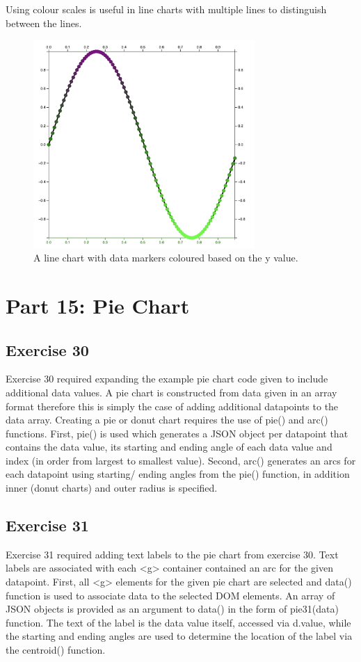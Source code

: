 \documentclass[11pt]{article}   	%
\begin{document}
Using colour scales is useful in line charts with multiple lines to distinguish between the lines.

\begin{figure}[H]
\centering
\includegraphics[width=0.75\textwidth]{data/ex29.png}
\caption{ A line chart with data markers coloured based on the y value.}
\label{fig:ex29}
\end{figure}


\section{Part 15: Pie Chart }
\subsection{Exercise 30}
\vspace{-1em}
Exercise 30 required expanding the example pie chart code given to include additional data values. A pie chart is constructed from data given in an array format therefore this is simply the case of adding additional datapoints to the data array. Creating a pie or donut chart requires the use of pie() and arc() functions. First, pie() is used which generates a JSON object per datapoint that contains the data value, its starting and ending angle of each data value and index (in order from largest to smallest value). Second, arc() generates an arcs for each datapoint using starting/ ending angles from the pie() function, in addition inner (donut charts) and outer radius is specified.

\subsection{ Exercise 31}
\vspace{-1em}
Exercise 31 required adding text labels to the pie chart from exercise 30. Text labels are associated with each <g> container contained an arc for the given datapoint. First, all <g> elements for the given pie chart are selected and data() function is used to associate data to the selected DOM elements. An array of JSON objects is provided as an argument to data() in the form of pie31(data) function. The text of the label is the data value itself, accessed via d.value, while the starting and ending angles are used to determine the location of the label via the centroid() function. 
\end{document}
